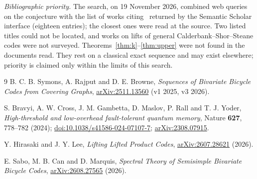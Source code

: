 \documentclass[11pt,a4paper]{article}
\theoremstyle{definition}
\theoremstyle{plain}
\begin{document}
\emph{Bibliographic priority.} The search, on 19 November 2026, combined web
queries on the conjecture with the list of works citing~\cite{Symons2025}
returned by the Semantic Scholar interface (eighteen entries); the closest
ones were read at the source. Two listed titles could not be located, and
works on lifts of general Calderbank--Shor--Steane codes were not surveyed.
Theorems~\ref{thm:k}--\ref{thm:upper} were not found in the documents read.
They rest on a classical exact sequence and may exist elsewhere; priority is
claimed only within the limits of this search.

\begingroup\small
\begin{thebibliography}{9}
\setlength{\itemsep}{2pt}
B. C. B. Symons, A. Rajput and D. E. Browne,
\emph{Sequences of Bivariate Bicycle Codes from Covering Graphs},
\href{https://arxiv.org/abs/2511.13560}{arXiv:2511.13560} (v1 2025, v3 2026).

S. Bravyi, A. W. Cross, J. M. Gambetta, D. Maslov, P. Rall and T. J. Yoder,
\emph{High-threshold and low-overhead fault-tolerant quantum memory},
Nature \textbf{627}, 778--782 (2024);
\href{https://doi.org/10.1038/s41586-024-07107-7}{doi:10.1038/s41586-024-07107-7};
\href{https://arxiv.org/abs/2308.07915}{arXiv:2308.07915}.

Y. Hirasaki and J. Y. Lee, \emph{Lifting Lifted Product Codes},
\href{https://arxiv.org/abs/2607.28621}{arXiv:2607.28621} (2026).

E. Sabo, M. B. Can and D. Marquis,
\emph{Spectral Theory of Semisimple Bivariate Bicycle Codes},
\href{https://arxiv.org/abs/2608.27565}{arXiv:2608.27565} (2026).
\end{thebibliography}
\endgroup
\end{document}
